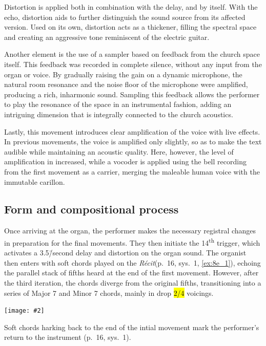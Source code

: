 \documentclass[12pt,twoside,maitrise]{dms_ks}
\newcommand{\customincludeexamples}[4][]{%
    \begin{example}[H]
        \centering
        \texttt{[image: \#2]}
        \caption{#4}
	\label{#3} 
    \end{example}
}
\theoremstyle{definition}
\begin{document}
{Distortion is applied both in combination with the delay, and by itself.
With the echo, distortion aids to further distinguish the sound source from its affected version.
Used on its own, distortion acts as a thickener, filling the spectral space and creating an aggressive tone reminiscent of the electric guitar.

Another element is the use of a sampler based on feedback from the church space itself. 
This feedback was recorded in complete silence, without any input from the organ or voice. 
By gradually raising the gain on a dynamic microphone, the natural room resonance and the noise floor of the microphone were amplified, producing a rich, inharmonic sound. 
Sampling this feedback allows the performer to play the resonance of the space in an instrumental fashion, adding an intriguing dimension that is integrally connected to the church acoustics. 

Lastly, this movement introduces clear amplification of the voice with live effects. In previous movements, the voice is amplified only slightly, so as to make the text audible while maintaining an acoustic quality.
Here, however, the level of amplification in increased, while a vocoder is applied using the bell recording from the first movement as a carrier, merging the maleable human voice with the immutable carillon.

\subsection{Form and compositional process}

Once arriving at the organ, the performer makes the necessary registral changes in preparation for the final movements. 
They then initiate the 14\textsuperscript{th} trigger, which activates a 3.5\=/second delay and distortion on the organ sound. 
The organist then enters with soft chords played on the \textit{Récit}(p.~16, sys.~1, \cref{ex:8e_1}), echoing the parallel stack of fifths heard at the end of the first movement. 
However, after the third iteration, the chords diverge from the original fifths, transitioning into a series of Major 7 and Minor 7 chords, mainly in drop \hl{2/4} voicings. 

\customincludeexamples[width=\textwidth]{8e_1}{ex:8e_1}{Soft chords harking back to the end of the intial movement mark the performer's return to the instrument (p.~16, sys.~1).}

}
\end{document}
